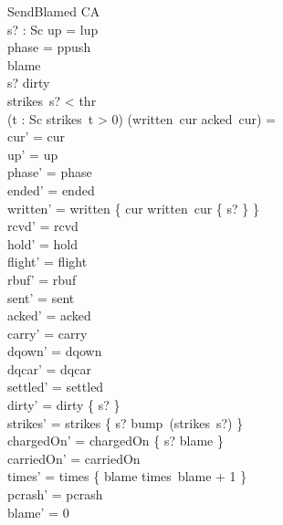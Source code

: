 \documentclass[a4paper,10pt,fleqn]{article}
\begin{document}
\begin{schema}{SendBlamed}
  \Delta CA \\
  s? : Sc
\where
  up = lup \\
  phase = ppush \\
  blame  \\
  s? \in dirty \\
  strikes~s? < thr \\
  (\exists t : Sc \spot strikes~t > 0) \implies (written~cur \setminus acked~cur) = \emptyset \\
  cur' = cur \\
  up' = up \\
  phase' = phase \\
  ended' = ended \\
  written' = written \oplus \{ cur \mapsto written~cur \cup \{ s? \} \} \\
  rcvd' = rcvd \\
  hold' = hold \\
  flight' = flight \\
  rbuf' = rbuf \\
  sent' = sent \\
  acked' = acked \\
  carry' = carry \\
  dqown' = dqown \\
  dqcar' = dqcar \\
  settled' = settled \\
  dirty' = dirty \setminus \{ s? \} \\
  strikes' = strikes \oplus \{ s? \mapsto bump~(strikes~s?) \} \\
  chargedOn' = chargedOn \cup \{ s? \mapsto blame \} \\
  carriedOn' = carriedOn \\
  times' = times \oplus \{ blame \mapsto times~blame + 1 \} \\
  pcrash' = pcrash \\
  blame' = 0
\end{schema}
\end{document}
